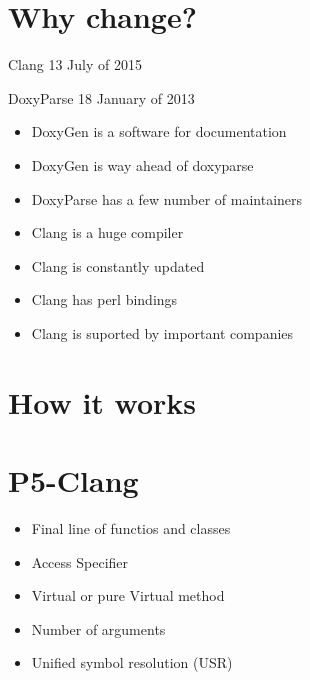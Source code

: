 \section{Why change?} %
\label{sec:why_change_}

\begin{frame}
\begin{Parallel}[v]{5cm}{5cm}
    \ParallelLText%
    {

        Clang  13 July of 2015
    }
    \ParallelRText%
    {
        DoxyParse 18 January of 2013
	}
\end{Parallel}
\end{frame}

\begin{frame}
   \begin{itemize} 
        \item DoxyGen is a software for documentation
        \item DoxyGen is way ahead of doxyparse
        \item DoxyParse has a few number of maintainers
    \end{itemize} 
\end{frame}

\begin{frame}
   \begin{itemize} 
        \item Clang is a huge compiler  
        \item Clang is constantly updated
        \item Clang has perl bindings
        \item Clang is suported by important companies
    \end{itemize}
\end{frame}


\section{How it works} %
\label{sec:how_it_works}

\begin{frame}
\end{frame}

\section{P5-Clang} %
\label{sec:p5_clang}

\begin{frame}
    \begin{itemize} 
        \item Final line of functios and classes  
        \item Access Specifier
        \item Virtual or pure Virtual method
        \item Number of arguments
        \item Unified symbol resolution (USR)
    \end{itemize}
\end{frame}

